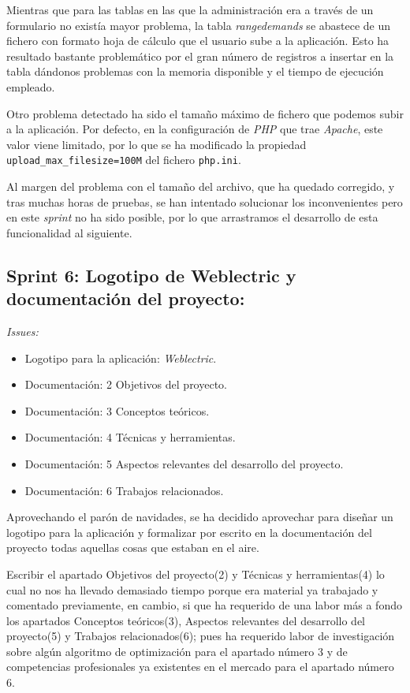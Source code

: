 Mientras que para las tablas en las que la administración era a través de un formulario no existía mayor problema, la tabla \textit{rangedemands} se abastece de un fichero con formato hoja de cálculo que el usuario sube a la aplicación. Esto ha resultado bastante problemático por el gran número de registros a insertar en la tabla dándonos problemas con la memoria disponible y el tiempo de ejecución empleado.

Otro problema detectado ha sido el tamaño máximo de fichero que podemos subir a la aplicación. Por defecto, en la configuración de \textit{PHP} que trae \textit{Apache}, este valor viene limitado, por lo que se ha modificado la propiedad  \verb|upload_max_filesize=100M| del fichero \verb|php.ini|.

Al margen del problema con el tamaño del archivo, que ha quedado corregido, y tras muchas horas de pruebas, se han intentado solucionar los inconvenientes pero en este \textit{sprint} no ha sido posible, por lo que arrastramos el desarrollo de esta funcionalidad al siguiente.


\subsection{Sprint 6: Logotipo de Weblectric y documentación del proyecto:}
\textit{Issues:}
\begin{itemize}
	\item Logotipo para la aplicación: \textit{Weblectric}.
	\item Documentación: 2 Objetivos del proyecto.
	\item Documentación: 3 Conceptos teóricos.
	\item Documentación: 4 Técnicas y herramientas.
	\item Documentación: 5 Aspectos relevantes del desarrollo del proyecto.
	\item Documentación: 6 Trabajos relacionados.
\end{itemize}

Aprovechando el parón de navidades, se ha decidido aprovechar para diseñar un logotipo para la aplicación y formalizar por escrito en la documentación del proyecto todas aquellas cosas que estaban en el aire.

Escribir el apartado \guillemotleft Objetivos del proyecto\guillemotright(2) y \guillemotleft Técnicas y herramientas\guillemotright(4) lo cual no nos ha llevado demasiado tiempo porque era material ya trabajado y comentado previamente, en cambio, si que ha requerido de una labor más a fondo los apartados \guillemotleft Conceptos teóricos\guillemotright(3), \guillemotleft Aspectos relevantes del desarrollo del proyecto\guillemotright(5) y \guillemotleft Trabajos relacionados\guillemotright(6); pues ha requerido labor de investigación sobre algún algoritmo de optimización para el apartado número 3 y de competencias profesionales ya existentes en el mercado para el apartado número 6. 


